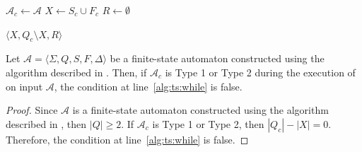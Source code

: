 \begin{algorithm}
  \caption{Finds a constant-size separator for the set of states of a finite-state
  automaton $\mathcal{A}$ constructed from a regular expression using the algorithm
  described in .}
  \label{alg:thompson_separator}

  \DontPrintSemicolon
  $\mathcal{A}_c \gets \mathcal{A}$\;
  $X \gets S_c \cup F_c$\;
  $R \gets \emptyset$\;

  \Return $\langle X, Q_c \setminus X, R \rangle$\;
\end{algorithm}

\begin{proposition}\label{prop:thompson_sep_1}
  Let $\mathcal{A} = \langle \Sigma, Q, S, F, \Delta \rangle$ be a finite-state
  automaton constructed using the algorithm described in . Then,
  if $\mathcal{A}_c$ is Type 1 or Type 2 during the execution of
   on input $\mathcal{A}$, the condition at line~\ref{alg:ts:while} is
  false.
\end{proposition}

\begin{proof}
  Since $\mathcal{A}$ is a finite-state automaton constructed using the algorithm
  described in , then $|Q| \geq 2$. If $\mathcal{A}_c$ is Type 1
  or Type 2, then $|Q_c| - |X| = 0$. Therefore, the condition at line~\ref{alg:ts:while} is false.
\end{proof}

